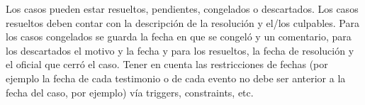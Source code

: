 \par Los casos pueden estar resueltos, pendientes, congelados o descartados. Los casos resueltos deben contar con la descripción de la resolución y el/los culpables. Para los casos congelados se guarda la fecha en que se congeló y un comentario, para los descartados el motivo y la fecha y para los resueltos, la fecha de resolución y el oficial que cerró el caso. Tener en cuenta las restricciones de fechas (por ejemplo la fecha de cada testimonio o de cada evento no debe ser anterior a la fecha del caso, por ejemplo) vía triggers, constraints, etc.
